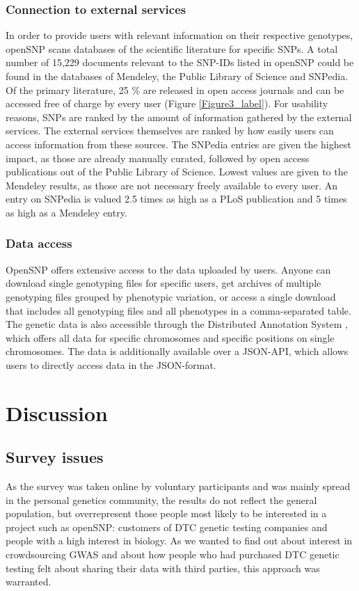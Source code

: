 \documentclass[10pt]{article}
\begin{document}
\subsubsection*{Connection to external services}
In order to provide users with relevant information on their respective genotypes, openSNP scans databases of the scientific literature for specific SNPs. 
A total number of 15,229 documents relevant to the SNP-IDs listed in openSNP could be found in the databases of Mendeley, the Public Library of Science and SNPedia. 
Of the primary literature, 25 \% are released in open access journals and can be accessed free of charge by every user (Figure \ref{Figure3_label}). For usability reasons, 
SNPs are ranked by the amount of information gathered by the external services. The external services themselves are ranked by how easily users can access information 
from these sources. The SNPedia entries are given the highest impact, as those are already manually curated, followed by open access publications out of 
the Public Library of Science. Lowest values are given to the Mendeley results, as those are not necessary freely available to every user. 
An entry on SNPedia is valued 2.5 times as high as a PLoS publication and 5 times as high as a Mendeley entry.  

\subsubsection*{Data access}
OpenSNP offers extensive access to the data uploaded by users. Anyone can download single genotyping files for specific users, get archives of multiple genotyping files 
grouped by phenotypic variation, or access a single download that includes all genotyping files and all phenotypes in a comma-separated table. The genetic data is also 
accessible through the Distributed Annotation System \cite{Dowell2001,Jenkinson2008}, which offers all data for specific chromosomes and specific positions on single chromosomes. 
The data is additionally available over a JSON-API, which allows users to directly access data in the JSON-format.


\section*{Discussion}

\subsection*{Survey issues}
As the survey was taken online by voluntary participants and was mainly spread in the personal genetics community, 
the results do not reflect the general population, but overrepresent those people most likely to be interested in
a project such as openSNP: customers of DTC genetic testing companies and people with a high interest in biology. 
As we wanted to find out about interest in crowdsourcing GWAS and about how people who had purchased DTC genetic 
testing felt about sharing their data with third parties, this approach was warranted.
\end{document}
